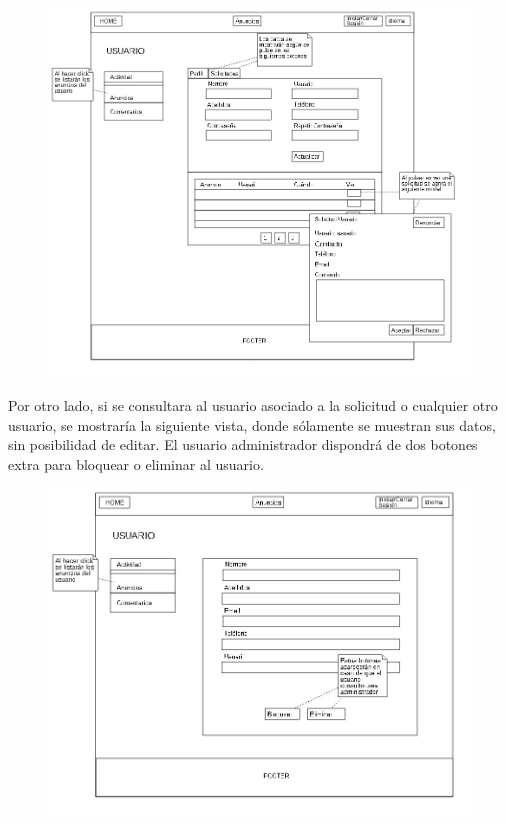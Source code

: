 \begin{figure}[h!]
\centering
\includegraphics[width=1\textwidth]{Img/VisionAplicacion/vision_4.jpg}
\end{figure}

Por otro lado, si se consultara al usuario asociado a la solicitud o cualquier otro usuario, se mostrar\'{i}a la siguiente vista, donde s\'{o}lamente se muestran sus datos, sin posibilidad de editar. El usuario administrador dispondr\'{a} de dos botones extra para bloquear o eliminar al usuario.\\

\begin{figure}[h!]
\centering
\includegraphics[width=1\textwidth]{Img/VisionAplicacion/vision_5.jpg}
\end{figure}

